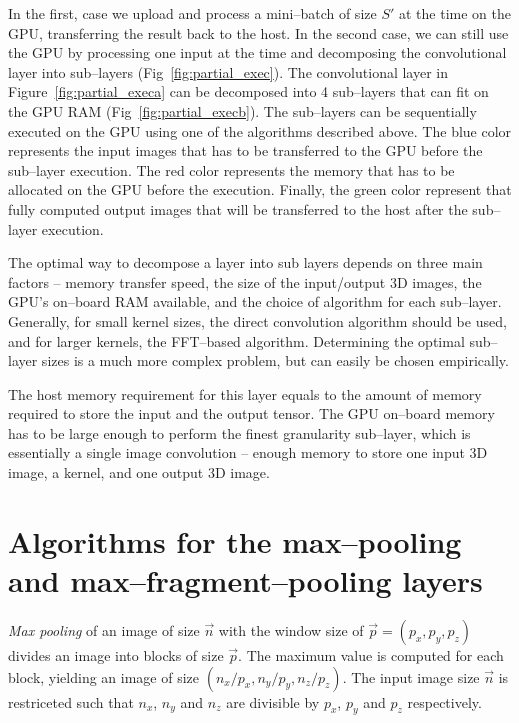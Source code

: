 \documentclass[conference]{IEEEtran}
\begin{document}
  In the first, case we upload and process a mini--batch of size $S'$
  at the time on the GPU, transferring the result back to the host.
  In the second case, we can still use the GPU by processing one input
  at the time and decomposing the convolutional layer into sub--layers
  (Fig~\ref{fig:partial_exec}). The convolutional layer in
  Figure~\ref{fig:partial_execa} can be decomposed into 4 sub--layers
  that can fit on the GPU RAM (Fig~\ref{fig:partial_execb}). The
  sub--layers can be sequentially executed on the GPU using one of the
  algorithms described above.  The blue color represents the input
  images that has to be transferred to the GPU before the sub--layer
  execution.  The red color represents the memory that has to be
  allocated on the GPU before the execution.  Finally, the green color
  represent that fully computed output images that will be transferred
  to the host after the sub--layer execution.

  The optimal way to decompose a layer into sub layers depends on
  three main factors -- memory transfer speed, the size of the
  input/output 3D images, the GPU's on--board RAM available, and the
  choice of algorithm for each sub--layer.  Generally, for small
  kernel sizes, the direct convolution algorithm should be used, and
  for larger kernels, the FFT--based algorithm.  Determining the
  optimal sub--layer sizes is a much more complex problem, but can
  easily be chosen empirically.

  The host memory requirement for this layer equals to the amount of
  memory required to store the input and the output tensor.  The GPU
  on--board memory has to be large enough to perform the finest
  granularity sub--layer, which is essentially a single image
  convolution -- enough memory to store one input 3D image, a kernel,
  and one output 3D image.

\section{Algorithms for the max--pooling and max--fragment--pooling layers}

  \emph{Max pooling} of an image of size $\vec{n}$ with the window
  size of $\vec{p} = (p_x,p_y,p_z)$ divides an image into blocks of
  size $\vec{p}$.  The maximum value is computed for each block,
  yielding an image of size $(n_x/p_x,n_y/p_y,n_z/p_z)$.  The input
  image size $\vec{n}$ is restriceted such that $n_x$, $n_y$ and $n_z$
  are divisible by $p_x$, $p_y$ and $p_z$ respectively.
\end{document}
